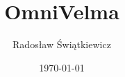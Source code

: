 \documentclass[a4paper]{report}
\begin{document}
\title{OmniVelma}
\author{Radosław Świątkiewicz}
\date{\today}
\maketitle

\tableofcontents
\end{document}
